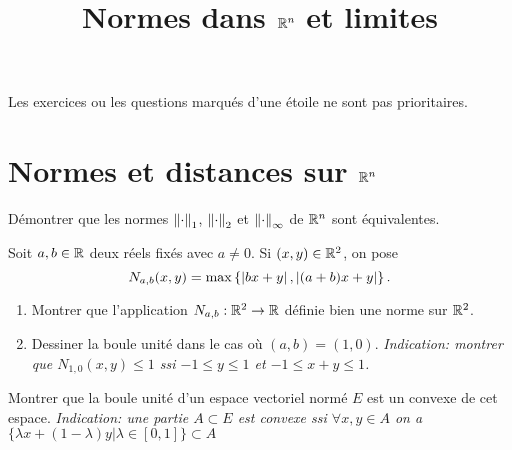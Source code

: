 \documentclass{tp_um}
\title{\large \sffamily\bfseries Normes dans $\mathbb{R}^n$ et limites}
\begin{document}
\maketitle

\bigskip

Les exercices ou les questions marqués d'une étoile ne sont pas prioritaires.



\section{Normes et distances sur $\mathbb{R}^n$}

 Démontrer que les normes $\left\lVert\cdot\right\rVert_1$, $\left\lVert\cdot\right\rVert_2$ et $\left\lVert\cdot\right\rVert_\infty$ de $\mathbb{R}^n$ sont équivalentes.

\bigskip
\newpage

 Soit $a,b \in \mathbb{R}$ deux réels fixés avec $a\neq 0$. Si $(x,y)\in\mathbb{R}^2$, on pose \[N_{a,b}(x,y) = \max \left\{ \left\lvert bx+y\right\rvert , \left\lvert(a+b)x+y\right\rvert \right\}.\] 
\begin{enumerate}
	\item Montrer que l'application $N_{a,b}:\mathbb{R}^2 \to\mathbb{R}$ définie bien une norme sur $\mathbb{R}^2$.
	\item Dessiner la boule unité dans le cas où $(a,b) = (1,0)$.
	{ \it  Indication: montrer que $N_{1,0} (x,y) \leq 1$ ssi $-1\leq y \leq 1$ et $-1\leq x+y\leq 1$.}
\end{enumerate}


\bigskip

\newpage
{}
Montrer que la boule unité d'un espace vectoriel normé $E$ est un convexe de cet espace. {\it Indication: une partie $A\subset E$ est convexe ssi $\forall x,y\in A$ on a $\{\lambda x + (1-\lambda) y| \lambda \in [0,1]\} \subset A $  }

\bigskip
\end{document}
